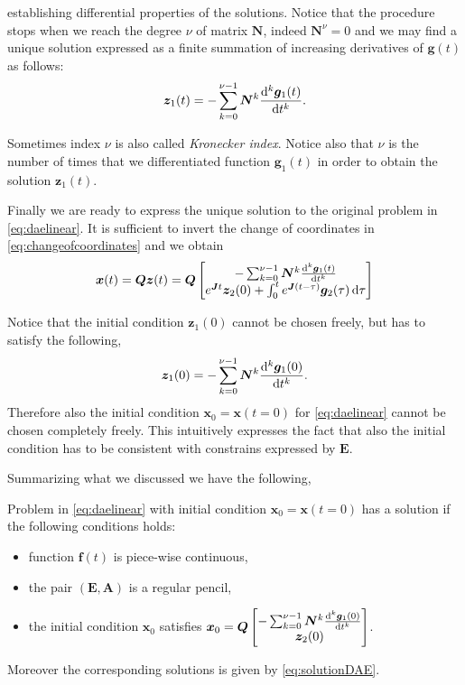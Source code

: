 		establishing differential properties of the solutions. Notice that the procedure stops when we reach the degree $\nu$ of matrix $\bm{N}$, indeed $\bm{N}^{\nu} = 0$ and we may find a unique solution expressed as a finite summation of increasing derivatives of $\bm{g}(t)$ as follows:
		\begin{equation}
			\bm{z}_{1}(t) = -\sum_{k=0}^{\nu-1}\bm{N}^{k}\frac{\mathop{}\!\mathrm{d}^{k} \bm{g}_{1}(t)}{\mathop{}\!\mathrm{d} t^{k}}.
		\end{equation}
		\begin{remark}
			Sometimes index $\nu$ is also called \emph{Kronecker index}. Notice also that $\nu$ is the number of times that we differentiated function $\bm{g}_{1}(t)$ in order to obtain the solution $\bm{z}_{1}(t)$.
		\end{remark}
		Finally we are ready to express the unique solution to the original problem in \cref{eq:daelinear}. It is sufficient to invert the change of coordinates in \cref{eq:changeofcoordinates} and we obtain
		\begin{equation}
			\label{eq:solutionDAE}
			\bm{x}(t) = \bm{Q}\bm{z}(t) = \bm{Q}
			\begin{bmatrix}
				-\sum_{k=0}^{\nu-1}\bm{N}^{k}\frac{\mathop{}\!\mathrm{d}^{k} \bm{g}_{1}(t)}{\mathop{}\!\mathrm{d} t^{k}} \\
				e^{\bm{J}t}\bm{z}_{2}(0)+\int_{0}^{t}e^{\bm{J}(t-\tau)}\bm{g}_{2}(\tau)\mathop{}\!\mathrm{d}\tau
			\end{bmatrix}
		\end{equation}
		\begin{remark}
			Notice that the initial condition $\bm{z}_{1}(0)$ cannot be chosen freely, but has to satisfy the following,
			\begin{equation}
				\bm{z}_{1}(0) = -\sum_{k=0}^{\nu-1}\bm{N}^{k}\frac{\mathop{}\!\mathrm{d}^{k}\bm{g}_{1}(0)}{\mathop{}\!\mathrm{d} t^{k}}.
			\end{equation}
			Therefore also the initial condition $\bm{x}_{0}=\bm{x}(t=0)$ for \cref{eq:daelinear} cannot be chosen completely freely. This intuitively expresses the fact that also the initial condition has to be consistent with constrains expressed by $\bm{E}$.
		\end{remark}
		Summarizing what we discussed we have the following,
		\begin{theorem}
			Problem in \cref{eq:daelinear} with initial condition $\bm{x}_{0} = \bm{x}(t=0)$ has a solution if the following conditions holds:
			\begin{itemize}
				\item function $\bm{f}(t)$ is piece-wise continuous,
				\item the pair $(\bm{E,A})$ is a regular pencil,
				\item the initial condition $\bm{x}_{0}$ satisfies 
				$\bm{x}_{0} = \bm{Q}\begin{bmatrix} -\sum_{k=0}^{\nu-1}\bm{N}^{k}\frac{\mathop{}\!\mathrm{d}^{k} \bm{g}_{1}(0)}{\mathop{}\!\mathrm{d} t^{k}} \\ \bm{z}_{2}(0) \end{bmatrix}$.
			\end{itemize}
			Moreover the corresponding solutions is given by \cref{eq:solutionDAE}.
		\end{theorem}
